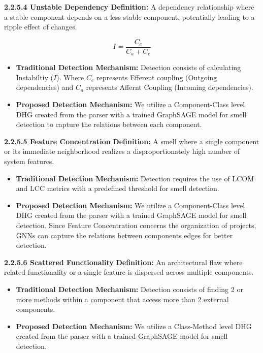 \vspace{1em}
\textbf{2.2.5.4 Unstable Dependency}
\textbf{Definition:} A dependency relationship where a stable component depends on a less stable component, potentially leading to a ripple effect of changes.

\[I = \frac{C_{e}}{C_{a} + C_{e}}\]

\begin{itemize}
    \item \textbf{Traditional Detection Mechanism:} Detection consists of calculating Instabiltiy ($I$). Where $C_e$ represents Efferent coupling (Outgoing dependencies) and $C_a$ represents Affernt Coupling (Incoming dependencies).
    \item \textbf{Proposed Detection Mechanism:} We utilize a Component-Class level DHG created from the parser with a trained GraphSAGE model for smell detection to capture the relations between each component.
\end{itemize}

\vspace{1em}
\textbf{2.2.5.5 Feature Concentration}
\textbf{Definition:} A smell where a single component or its immediate neighborhood realizes a disproportionately high number of system features.
\begin{itemize}
    \item \textbf{Traditional Detection Mechanism:} Detection requires the use of LCOM and LCC metrics with a predefined threshold for smell detection.
    \item \textbf{Proposed Detection Mechanism:} We utilize a Component-Class level DHG created from the parser with a trained GraphSAGE model for smell detection.
     Since Feature Concentration concerns the organization of projects, GNNs can capture the relations between components edges for better detection.
\end{itemize}

\vspace{1em}
\textbf{2.2.5.6 Scattered Functionality}
\textbf{Definition:} An architectural flaw where related functionality or a single feature is dispersed across multiple components.
\begin{itemize}
    \item \textbf{Traditional Detection Mechanism:} Detection consists of finding 2 or more methods within a component that access more than 2 external components.
    \item \textbf{Proposed Detection Mechanism:} We utilize a Class-Method level DHG created from the parser with a trained GraphSAGE model for smell detection.
\end{itemize}

